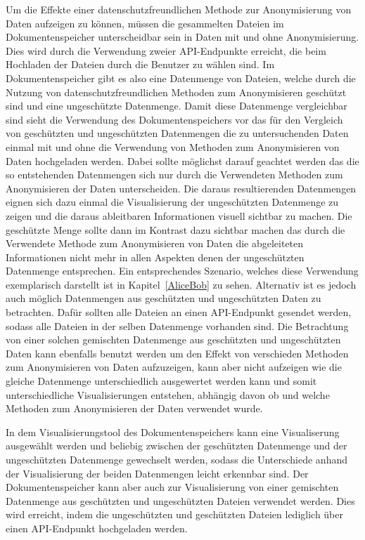 \documentclass[
    fontsize=12pt,
    headings=small,
    parskip=half,           %
    bibliography=totoc,
    numbers=noenddot,       %
    open=any,               %
    ]{scrreprt}
\begin{document}
Um die Effekte einer datenschutzfreundlichen Methode zur Anonymisierung von Daten aufzeigen zu können, müssen die gesammelten Dateien im Dokumentenspeicher unterscheidbar sein in Daten mit und ohne Anonymisierung. 
Dies wird durch die Verwendung zweier API-Endpunkte erreicht, die beim Hochladen der Dateien durch die Benutzer zu wählen sind.
Im Dokumentenspeicher gibt es also eine Datenmenge von Dateien, welche durch die Nutzung von datenschutzfreundlichen Methoden zum Anonymisieren geschützt sind und eine ungeschützte Datenmenge.
Damit diese Datenmenge vergleichbar sind sieht die Verwendung des Dokumentenspeichers vor das für den Vergleich von geschützten und ungeschützten Datenmengen die zu untersuchenden Daten einmal mit und ohne die Verwendung von Methoden zum Anonymisieren von Daten hochgeladen werden. 
Dabei sollte möglichst darauf geachtet werden das die so entstehenden Datenmengen sich nur durch die Verwendeten Methoden zum Anonymisieren der Daten unterscheiden. 
Die daraus resultierenden Datenmengen eignen sich dazu einmal die Visualisierung der ungeschützten Datenmenge zu zeigen und die daraus ableitbaren Informationen visuell sichtbar zu machen.
Die geschützte Menge sollte dann im Kontrast dazu sichtbar machen das durch die Verwendete Methode zum Anonymisieren von Daten die abgeleiteten Informationen nicht mehr in allen Aspekten denen der ungeschützten Datenmenge entsprechen.
Ein entsprechendes Szenario, welches diese Verwendung exemplarisch darstellt ist in Kapitel~\ref{AliceBob} zu sehen.
Alternativ ist es jedoch auch möglich Datenmengen aus geschützten und ungeschützten Daten zu betrachten.
Dafür sollten alle Dateien an einen \ac{API}-Endpunkt gesendet werden, sodass alle Dateien in der selben Datenmenge vorhanden sind.
Die Betrachtung von einer solchen gemischten Datenmenge aus geschützten und ungeschützten Daten kann ebenfalls benutzt werden um den Effekt von verschieden Methoden zum Anonymisieren von Daten aufzuzeigen, kann aber nicht aufzeigen wie die gleiche Datenmenge unterschiedlich ausgewertet werden kann und somit unterschiedliche Visualisierungen entstehen, abhängig davon ob und welche Methoden zum Anonymisieren der Daten verwendet wurde. 

In dem Visualisierungstool des Dokumentenspeichers kann eine Visualiserung ausgewählt werden und beliebig zwischen der geschützten Datenmenge und der ungeschützten Datenmenge gewechselt werden, sodass die Unterschiede anhand der Visualisierung der beiden Datenmengen leicht erkennbar sind.
Der Dokumentenspeicher kann aber auch zur Visualisierung von einer gemischten Datenmenge aus geschützten und ungeschützten Dateien verwendet werden. 
Dies wird erreicht, indem die ungeschützten und geschützten Dateien lediglich über einen \ac{API}-Endpunkt hochgeladen werden.
\end{document}

